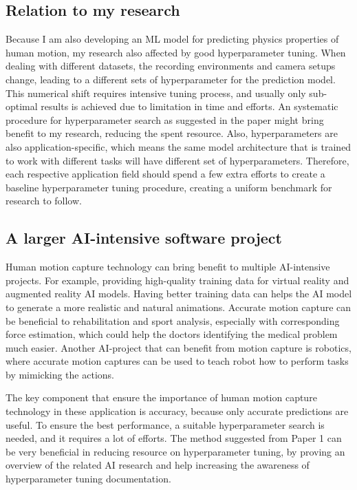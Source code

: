 \documentclass{article}
\begin{document}
\subsection{Relation to my research}
Because I am also developing an ML model for predicting physics properties of human motion, my research also affected by good hyperparameter tuning. When dealing with different datasets, the recording environments and camera setups change, leading to a different sets of hyperparameter for the prediction model. This numerical shift requires intensive tuning process, and usually only sub-optimal results is achieved due to limitation in time and efforts. An systematic procedure for hyperparameter search as suggested in the paper might bring benefit to my research, reducing the spent resource. Also, hyperparameters are also application-specific, which means the same model architecture that is trained to work with different tasks will have different set of hyperparameters. Therefore, each respective application field should spend a few extra efforts to create a baseline hyperparameter tuning procedure, creating a uniform benchmark for research to follow.

\subsection{A larger AI-intensive software project}
Human motion capture technology can bring benefit to multiple AI-intensive projects. For example, providing high-quality training data for virtual reality and augmented reality AI models. Having better training data can helps the AI model to generate a more realistic and natural animations. Accurate motion capture can be beneficial to rehabilitation and sport analysis, especially with corresponding force estimation, which could help the doctors identifying the medical problem much easier. Another AI-project that can benefit from motion capture is robotics, where accurate motion captures can be used to teach robot how to perform tasks by mimicking the actions.

The key component that ensure the importance of human motion capture technology in these application is accuracy, because only accurate predictions are useful. To ensure the best performance, a suitable hyperparameter search is needed, and it requires a lot of efforts. The method suggested from Paper 1 can be very beneficial in reducing resource on hyperparameter tuning, by proving an overview of the related AI research and help increasing the awareness of hyperparameter tuning documentation.
\end{document}

